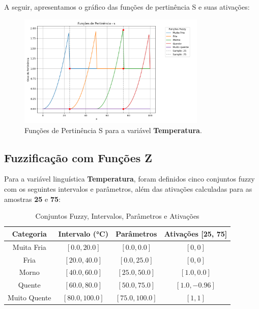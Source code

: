 \documentclass[a4paper,12pt]{article}
\begin{document}
A seguir, apresentamos o gráfico das funções de pertinência S e suas ativações:

\begin{figure}[H]
    \centering
    \includegraphics[width=0.8\textwidth]{img/funções_de_pertinência_s_fuzzificado.png}
    \caption{Funções de Pertinência S para a variável \textbf{Temperatura}.}
\end{figure}

\subsection{Fuzzificação com Funções Z}

Para a variável linguística \textbf{Temperatura}, foram definidos cinco conjuntos fuzzy com os seguintes intervalos e parâmetros, além das ativações calculadas para as amostras \textbf{25} e \textbf{75}:

\begin{table}[H]
\centering
\caption{Conjuntos Fuzzy, Intervalos, Parâmetros e Ativações}
\begin{tabular}{|c|c|c|c|}
\hline
\textbf{Categoria}    & \textbf{Intervalo (°C)} & \textbf{Parâmetros}       & \textbf{Ativações [25, 75]} \\ \hline
Muita Fria            & $[0.0, 20.0]$          & $[0.0, 0.0]$              & $[0, 0]$                   \\ \hline
Fria                  & $[20.0, 40.0]$         & $[0.0, 25.0]$             & $[0, 0]$                   \\ \hline
Morno                 & $[40.0, 60.0]$         & $[25.0, 50.0]$            & $[1.0, 0.0]$               \\ \hline
Quente                & $[60.0, 80.0]$         & $[50.0, 75.0]$            & $[1.0, -0.96]$             \\ \hline
Muito Quente          & $[80.0, 100.0]$        & $[75.0, 100.0]$           & $[1, 1]$                   \\ \hline
\end{tabular}
\end{table}
\end{document}
